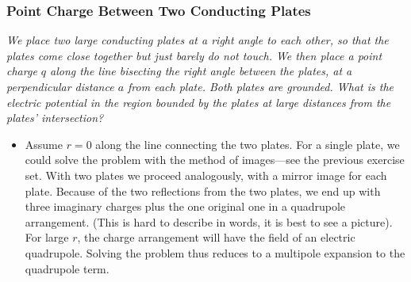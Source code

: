 \documentclass[11pt, a4paper]{article}
\begin{document}
\subsubsection{Point Charge Between Two Conducting Plates}
\textit{We place two large conducting plates at a right angle to each other, so that the plates come close together but just barely do not touch. We then place a point charge $ q $ along the line bisecting the right angle between the plates, at a perpendicular distance $ a $ from each plate. Both plates are grounded. What is the electric potential in the region bounded by the plates at large distances from the plates' intersection?}
\begin{itemize}
	\item Assume $ r = 0 $ along the line connecting the two plates. For a single plate, we could solve the problem with the method of images---see the previous exercise set. With two plates we proceed analogously, with a mirror image for each plate. Because of the two reflections from the two plates, we end up with three imaginary charges plus the one original one in a quadrupole arrangement. (This is hard to describe in words, it is best to see a picture). For large $ r $, the charge arrangement will have the field of an electric quadrupole. Solving the problem thus reduces to a multipole expansion to the quadrupole term.  
\end{itemize}	
	
\end{document}
